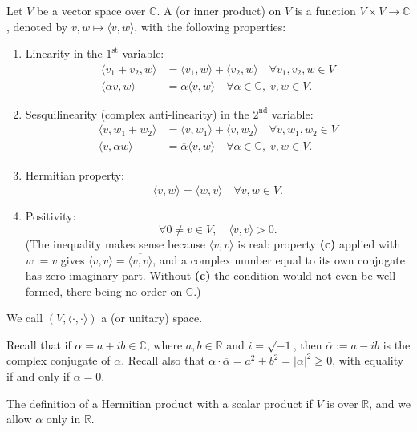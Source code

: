 \begin{definition}
\label{def:hermitian_product_complex}
Let $V$ be a vector space over $\mathbb{C}$. A  (or inner product) on $V$ is a function $V \times V \longrightarrow \mathbb{C}$, denoted by $v, w \mapsto \langle v, w \rangle$, with the following properties:
\begin{enumerate}[label=\textbf{(\alph*)}]
    \item Linearity in the $1^{\text{st}}$ variable:
    \begin{align*}
        \langle v_1 + v_2, w \rangle &= \langle v_1, w \rangle + \langle v_2, w \rangle \quad \forall v_1, v_2, w \in V \\
        \langle \alpha v, w \rangle &= \alpha \langle v, w \rangle \quad \forall \alpha \in \mathbb{C}, \; v, w \in V.
    \end{align*}
    \item Sesquilinearity (complex anti-linearity) in the $2^{\text{nd}}$ variable:
    \begin{align*}
        \langle v, w_1 + w_2 \rangle &= \langle v, w_1 \rangle + \langle v, w_2 \rangle \quad \forall v, w_1, w_2 \in V \\
        \langle v, \alpha w \rangle &= \overline{\alpha} \langle v, w \rangle \quad \forall \alpha \in \mathbb{C}, \; v, w \in V.
    \end{align*}
    \item Hermitian property:
    \[
        \langle v, w \rangle = \overline{\langle w, v \rangle} \quad \forall v, w \in V.
    \]
    \item Positivity:
    \[
        \forall 0 \neq v \in V, \quad \langle v, v \rangle > 0.
    \]
    (The inequality makes sense because $\langle v, v \rangle$ is real: property \textbf{(c)} applied with $w := v$ gives $\langle v, v \rangle = \overline{\langle v, v \rangle}$, and a complex number equal to its own conjugate has zero imaginary part. Without \textbf{(c)} the condition  would not even be well formed, there being no order on $\mathbb{C}$.)
\end{enumerate}
We call $(V, \langle \cdot, \cdot \rangle)$ a  (or unitary) space.
\end{definition}

\begin{remark}
Recall that if $\alpha = a + ib \in \mathbb{C}$, where $a, b \in \mathbb{R}$ and $i = \sqrt{-1}$, then $\overline{\alpha} := a - ib$ is the complex conjugate of $\alpha$. Recall also that $\alpha \cdot \overline{\alpha} = a^2 + b^2 = |\alpha|^2 \geq 0$, with equality if and only if $\alpha = 0$.

The definition of a Hermitian product  with a scalar product if $V$ is over $\mathbb{R}$, and we allow $\alpha$ only in $\mathbb{R}$.
\end{remark}

